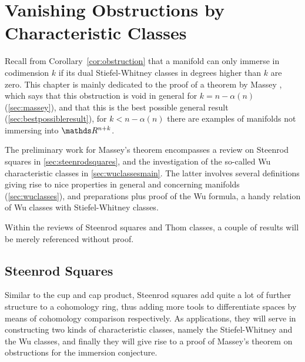 % 

\chapter{Vanishing Obstructions by Characteristic Classes}
\label{chap:massey}
Recall from Corollary~\autoref{cor:obstruction} that a manifold can
only immerse in codimension $k$ if its dual Stiefel-Whitney classes in
degrees higher than $k$ are zero.
This chapter is mainly dedicated to the proof of a theorem by Massey
\cite{massey}, which says that this obstruction is void in general for
$k=n-\alpha(n)$ (\autoref{sec:massey}), and that this is the best
possible general result (\autoref{sec:bestpossibleresult}), \idest for
$k<n-\alpha(n)$ there are examples of manifolds not immersing into
$\R^{n+k}$.

The preliminary work for Massey's theorem encompasses a review on
Steenrod squares in \autoref{sec:steenrodsquares}, and the
investigation of the so-called Wu characteristic classes in
\autoref{sec:wuclassesmain}.
The latter involves several definitions giving rise to nice properties
in general and concerning manifolds (\autoref{sec:wuclasses}), and
preparations plus proof of the Wu formula, a handy relation of Wu
classes with Stiefel-Whitney classes.

Within the reviews of Steenrod squares and Thom classes, a couple of
results will be merely referenced without proof.

\section{Steenrod Squares}\label{sec:steenrodsquares}
Similar to the cup and cap product, Steenrod squares add quite a lot
of further structure to a cohomology ring, thus adding more tools to
differentiate spaces by means of cohomology comparison respectively.
As applications, they will serve in constructing two kinds of
characteristic classes, namely the Stiefel-Whitney and the Wu
classes, and finally they will give rise to a proof of Massey's
theorem on obstructions for the immersion conjecture.

